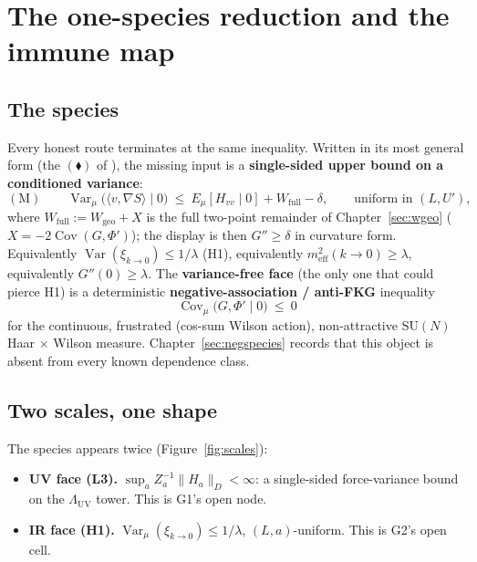 \section{The one-species reduction and the immune map}
\label{ch:immune}

\subsection{The species}

Every honest route terminates at the same inequality. Written in its most general form (the
$(\blacklozenge)$ of ), the missing input is a
\textbf{single-sided upper bound on a conditioned variance}:
\begin{equation}
(\mathrm{M})\qquad
\operatorname{Var}_\mu\bigl(\langle v,\nabla S\rangle\mid0\bigr)
\ \le\ E_\mu[H_{vv}\mid0]+W_{\mathrm{full}}-\delta ,
\qquad\text{uniform in }(L,U'),
\label{eq:species}
\end{equation}
where $W_{\mathrm{full}}:=W_{\mathrm{geo}}+X$ is the full two-point remainder of
Chapter~\ref{sec:wgeo} ($X=-2\operatorname{Cov}(G,\Phi')$); the display is then $G''\ge\delta$ in
curvature form. Equivalently $\operatorname{Var}(\xi_{k\to0})\le1/\lambda$ (H1), equivalently
$m_{\mathrm{eff}}^2(k\to0)\ge\lambda$, equivalently $G''(0)\ge\lambda$. The
\textbf{variance-free face} (the only one that could pierce H1) is a deterministic
\textbf{negative-association / anti-FKG} inequality
\begin{equation}
\operatorname{Cov}_\mu\bigl(G,\Phi'\mid0\bigr)\ \le\ 0
\label{eq:neqassoc2}
\end{equation}
for the continuous, frustrated (cos-sum Wilson action), non-attractive $\mathrm{SU}(N)$ Haar
$\times$ Wilson measure. Chapter~\ref{sec:negspecies} records that this object is absent from
every known dependence class.

\subsection{Two scales, one shape}

The species appears twice (Figure~\ref{fig:scales}):

\begin{itemize}
\item \textbf{UV face (L3).} $\sup_aZ_a^{-1}\|H_a\|_D<\infty$: a single-sided force-variance
  bound on the $\Lambda_{\mathrm{UV}}$ tower. This is G1's open node.
\item \textbf{IR face (H1).} $\operatorname{Var}_\mu(\xi_{k\to0})\le1/\lambda$, $(L,a)$-uniform.
  This is G2's open cell.
\end{itemize}

